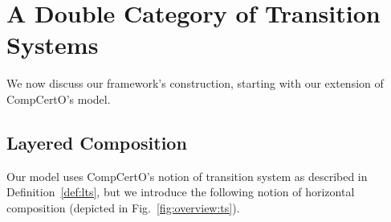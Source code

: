 \documentclass[acmsmall,screen,review,anonymous]{acmart}
\begin{document}

\section{A Double Category of Transition Systems} \label{sec:base} %

We now discuss our framework's construction,
starting with our extension of CompCertO's model.

\subsection{Layered Composition} \label{sec:base:ts} %

Our model uses CompCertO's notion of transition system
as described in Definition~\ref{def:lts},
but we introduce the following notion of horizontal composition
(depicted in Fig.~\ref{fig:overview:ts}).
\end{document}
